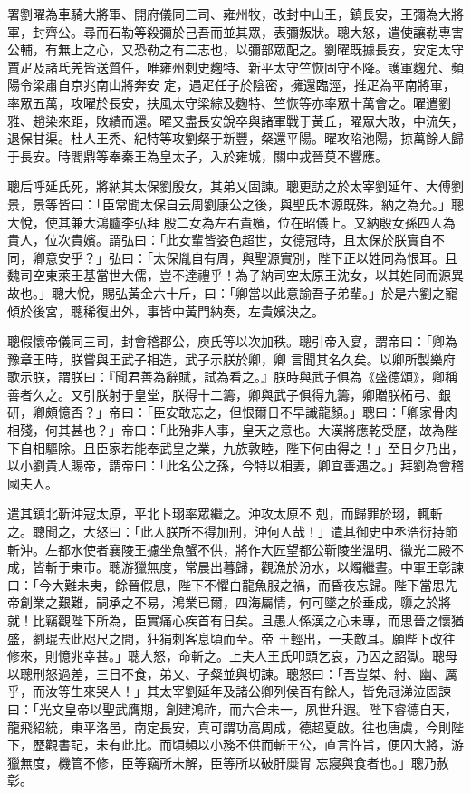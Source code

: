 \begin{pinyinscope}
 署劉曜為車騎大將軍、開府儀同三司、雍州牧，改封中山王，鎮長安，王彌為大將軍，封齊公。尋而石勒等殺彌於己吾而並其眾，表彌叛狀。聰大怒，遣使讓勒專害公輔，有無上之心，又恐勒之有二志也，以彌部眾配之。劉曜既據長安，安定太守賈疋及諸氐羌皆送質任，唯雍州刺史麴特、新平太守竺恢固守不降。護軍麴允、頻陽令梁肅自京兆南山將奔安
 定，遇疋任子於陰密，擁還臨涇，推疋為平南將軍，率眾五萬，攻曜於長安，扶風太守梁綜及麴特、竺恢等亦率眾十萬會之。曜遣劉雅、趙染來距，敗績而還。曜又盡長安銳卒與諸軍戰于黃丘，曜眾大敗，中流矢，退保甘渠。杜人王禿、紀特等攻劉粲于新豐，粲還平陽。曜攻陷池陽，掠萬餘人歸于長安。時閻鼎等奉秦王為皇太子，入於雍城，關中戎晉莫不響應。



 聰后呼延氏死，將納其太保劉殷女，其弟乂固諫。聰更訪之於太宰劉延年、大傅劉景，景等皆曰：「臣常聞太保自云周劉康公之後，與聖氏本源既殊，納之為允。」聰大悅，使其兼大鴻臚李弘拜
 殷二女為左右貴嬪，位在昭儀上。又納殷女孫四人為貴人，位次貴嬪。謂弘曰：「此女輩皆姿色超世，女德冠時，且太保於朕實自不同，卿意安乎？」弘曰：「太保胤自有周，與聖源實別，陛下正以姓同為恨耳。且魏司空東萊王基當世大儒，豈不達禮乎！為子納司空太原王沈女，以其姓同而源異故也。」聰大悅，賜弘黃金六十斤，曰：「卿當以此意諭吾子弟輩。」於是六劉之寵傾於後宮，聰稀復出外，事皆中黃門納奏，左貴嬪決之。



 聰假懷帝儀同三司，封會稽郡公，庾氏等以次加秩。聰引帝入宴，謂帝曰：「卿為豫章王時，朕嘗與王武子相造，武子示朕於卿，卿
 言聞其名久矣。以卿所製樂府歌示朕，謂朕曰：『聞君善為辭賦，試為看之。』朕時與武子俱為《盛德頌》，卿稱善者久之。又引朕射于皇堂，朕得十二籌，卿與武子俱得九籌，卿贈朕柘弓、銀研，卿頗憶否？」帝曰：「臣安敢忘之，但恨爾日不早識龍顏。」聰曰：「卿家骨肉相殘，何其甚也？」帝曰：「此殆非人事，皇天之意也。大漢將應乾受歷，故為陛下自相驅除。且臣家若能奉武皇之業，九族敦睦，陛下何由得之！」至日夕乃出，以小劉貴人賜帝，謂帝曰：「此名公之孫，今特以相妻，卿宜善遇之。」拜劉為會稽國夫人。



 遣其鎮北靳沖寇太原，平北卜珝率眾繼之。沖攻太原不
 剋，而歸罪於珝，輒斬之。聰聞之，大怒曰：「此人朕所不得加刑，沖何人哉！」遣其御史中丞浩衍持節斬沖。左都水使者襄陵王攄坐魚蟹不供，將作大匠望都公靳陵坐溫明、徽光二殿不成，皆斬于東市。聰游獵無度，常晨出暮歸，觀漁於汾水，以燭繼晝。中軍王彰諫曰：「今大難未夷，餘晉假息，陛下不懼白龍魚服之禍，而昏夜忘歸。陛下當思先帝創業之艱難，嗣承之不易，鴻業已爾，四海屬情，何可墜之於垂成，隳之於將就！比竊觀陛下所為，臣實痛心疾首有日矣。且愚人係漢之心未專，而思晉之懷猶盛，劉琨去此咫尺之間，狂狷刺客息頃而至。帝
 王輕出，一夫敵耳。願陛下改往修來，則憶兆幸甚。」聰大怒，命斬之。上夫人王氏叩頭乞哀，乃囚之詔獄。聰母以聰刑怒過差，三日不食，弟乂、子粲並與切諫。聰怒曰：「吾豈桀、紂、幽、厲乎，而汝等生來哭人！」其太宰劉延年及諸公卿列侯百有餘人，皆免冠涕泣固諫曰：「光文皇帝以聖武膺期，創建鴻祚，而六合未一，夙世升遐。陛下睿德自天，龍飛紹統，東平洛邑，南定長安，真可謂功高周成，德超夏啟。往也唐虞，今則陛下，歷觀書記，未有此比。而頃頻以小務不供而斬王公，直言忤旨，便囚大將，游獵無度，機管不修，臣等竊所未解，臣等所以破肝糜胃
 忘寢與食者也。」聰乃赦彰。




\end{pinyinscope}
